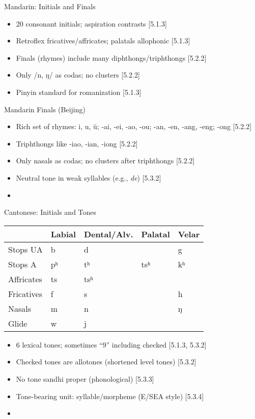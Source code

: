\documentclass{beamer}
\newcommand{\booksrc}[1]{\hfill {\tiny [#1]}}
\begin{document}

\begin{frame}{Mandarin: Initials and Finals}
\begin{itemize}
\item 20 consonant initials; aspiration contrasts \booksrc{5.1.3}
\item Retroflex fricatives/affricates; palatals allophonic \booksrc{5.1.3}
\item Finals (rhymes) include many diphthongs/triphthongs \booksrc{5.2.2}
\item Only /n, ŋ/ as codas; no clusters \booksrc{5.2.2}
\item Pinyin standard for romanization \booksrc{5.1.3}
\end{itemize}
\end{frame}

\begin{frame}{Mandarin Finals (Beijing)}
\begin{itemize}
\item Rich set of rhymes: i, u, ü; -ai, -ei, -ao, -ou; -an, -en, -ang, -eng; -ong \booksrc{5.2.2}
\item Triphthongs like -iao, -ian, -iong \booksrc{5.2.2}
\item Only nasals as codas; no clusters after triphthongs \booksrc{5.2.2}
\item Neutral tone in weak syllables (e.g., \emph{de}) \booksrc{5.3.2}
\item %
\end{itemize}
\end{frame}

\begin{frame}{Cantonese: Initials and Tones}
\begin{tabular}{lllll}
 & Labial & Dental/Alv. & Palatal & Velar \\
\hline
Stops UA & b & d &  & g \\
Stops A & pʰ & tʰ & tsʰ & kʰ \\
Affricates & ts & tsʰ &  &  \\
Fricatives & f & s &  & h \\
Nasals & m & n &  & ŋ \\
Glide & w & j &  &  \\
\end{tabular}
\begin{itemize}
\item 6 lexical tones; sometimes “9” including checked \booksrc{5.1.3, 5.3.2}
\item Checked tones are allotones (shortened level tones) \booksrc{5.3.2}
\item No tone sandhi proper (phonological) \booksrc{5.3.3}
\item Tone-bearing unit: syllable/morpheme (E/SEA style) \booksrc{5.3.4}
\item %
\end{itemize}
\end{frame}
\end{document}

